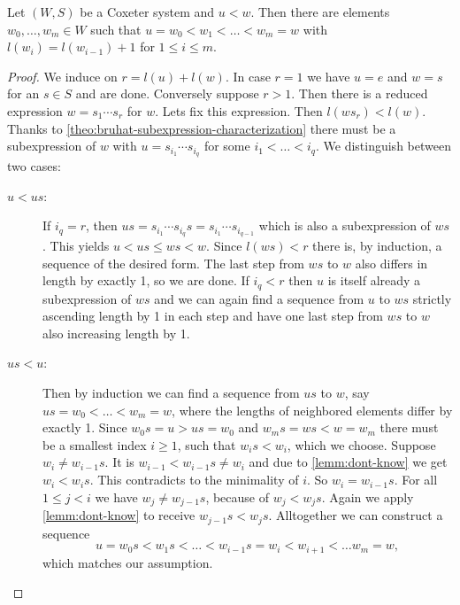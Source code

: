 \begin{prop}
	Let $(W,S)$ be a Coxeter system and $u < w$. Then there are elements $w_0,\ldots,w_m \in W$ such that $u = w_0 < w_1 < \ldots < w_m = w$ with $l(w_i) = l(w_{i-1}) + 1$ for $1 \leq i \leq m$.

	\begin{proof}
		We induce on $r = l(u) + l(w)$. In case $r = 1$ we have $u = e$ and $w = s$ for an $s \in S$ and are done. Conversely suppose $r > 1$. Then there is a reduced expression $w = s_1 \cdots s_r$ for $w$. Lets fix this expression. Then $l(w s_r) < l(w)$. Thanks to \ref{theo:bruhat-subexpression-characterization} there must be a subexpression of $w$ with $u = s_{i_1} \cdots s_{i_q}$ for some $i_1 < \ldots < i_q$. We distinguish between two cases:

		\begin{description}
			\item[$u < us$:] If $i_q = r$, then $us = s_{i_1} \cdots s_{i_q} s = s_{i_1} \cdots s_{i_{q-1}}$ which is also a subexpression of $ws$. This yields $u < us \leq ws < w$. Since $l(ws) < r$ there is, by induction, a sequence of the desired form. The last step from $ws$ to $w$ also differs in length by exactly 1, so we are done. If $i_q < r$ then $u$ is itself already a subexpression of $ws$ and we can again find a sequence from $u$ to $ws$ strictly ascending length by 1 in each step and have one last step from $ws$ to $w$ also increasing length by 1.
			\item[$us < u$:] Then by induction we can find a sequence from $us$ to $w$, say $us = w_0 < \ldots < w_m = w$, where the lengths of neighbored elements differ by exactly 1. Since $w_0 s = u > us = w_0$ and $w_m s = ws < w = w_m$ there must be a smallest index $i \geq 1$, such that $w_i s < w_i$, which we choose. Suppose $w_i \neq w_{i-1} s$. It is $w_{i-1} < w_{i-1}s \neq w_i$ and due to \ref{lemm:dont-know} we get $w_i < w_i s$. This contradicts to the minimality of $i$. So $w_i = w_{i-1} s$. For all $1 \leq j < i$ we have $w_j \neq w_{j-1} s$, because of $w_j < w_j s$. Again we apply \ref{lemm:dont-know} to receive $w_{j-1} s < w_j s$. Alltogether we can construct a sequence
			$$ u = w_0 s < w_1 s < \ldots < w_{i-1} s = w_i < w_{i+1} < \ldots w_m = w, $$
			which matches our assumption. \qedhere
		\end{description}
	\end{proof}
\end{prop}

